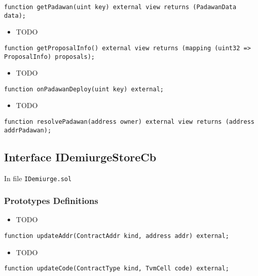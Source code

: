 \begin{lstlisting}[firstnumber=16]
    function getPadawan(uint key) external view returns (PadawanData data);
\end{lstlisting}
\begin{itemize}
\item TODO
\end{itemize}

\begin{lstlisting}[firstnumber=15]
    function getProposalInfo() external view returns (mapping (uint32 => ProposalInfo) proposals);
\end{lstlisting}
\begin{itemize}
\item TODO
\end{itemize}

\begin{lstlisting}[firstnumber=8]
    function onPadawanDeploy(uint key) external;
\end{lstlisting}
\begin{itemize}
\item TODO
\end{itemize}

\begin{lstlisting}[firstnumber=18]
    function resolvePadawan(address owner) external view returns (address addrPadawan);
\end{lstlisting}

\subsection{Interface IDemiurgeStoreCb}

\minitoc

In file {\tt IDemiurge.sol}

\subsubsection{Prototypes Definitions}

\begin{itemize}
\item TODO
\end{itemize}

\begin{lstlisting}[firstnumber=22]
    function updateAddr(ContractAddr kind, address addr) external;
\end{lstlisting}
\begin{itemize}
\item TODO
\end{itemize}

\begin{lstlisting}[firstnumber=23]
    function updateCode(ContractType kind, TvmCell code) external;
\end{lstlisting}
